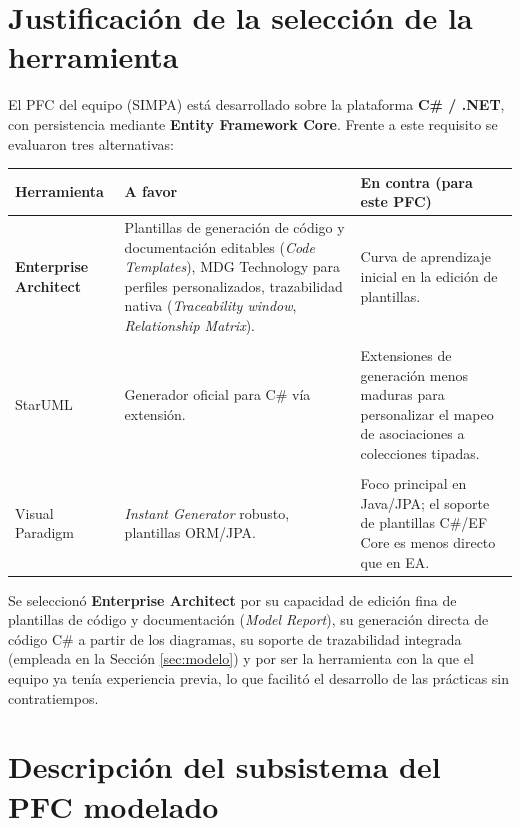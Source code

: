 \documentclass[11pt,a4paper]{article}
\begin{document}
	\section{Justificación de la selección de la herramienta}
	
	El PFC del equipo (SIMPA) está desarrollado sobre la plataforma \textbf{C\# / .NET}, con persistencia mediante \textbf{Entity Framework Core}. Frente a este requisito se evaluaron tres alternativas:
	
	\begin{center}
		\begin{tabularx}{\textwidth}{lXX}
			\toprule
			\textbf{Herramienta} & \textbf{A favor} & \textbf{En contra (para este PFC)} \\
			\midrule
			\textbf{Enterprise Architect} & Plantillas de generación de código y documentación editables (\textit{Code Templates}), MDG Technology para perfiles personalizados, trazabilidad nativa (\textit{Traceability window}, \textit{Relationship Matrix}). & Curva de aprendizaje inicial en la edición de plantillas. \\
			\\
			StarUML & Generador oficial para C\# vía extensión. & Extensiones de generación menos maduras para personalizar el mapeo de asociaciones a colecciones tipadas. \\
			\\
			Visual Paradigm & \textit{Instant Generator} robusto, plantillas ORM/JPA. & Foco principal en Java/JPA; el soporte de plantillas C\#/EF Core es menos directo que en EA. \\
			\bottomrule
		\end{tabularx}
	\end{center}
	
	Se seleccionó \textbf{Enterprise Architect} por su capacidad de edición fina de plantillas de código y documentación (\textit{Model Report}), su generación directa de código C\# a partir de los diagramas, su soporte de trazabilidad integrada (empleada en la Sección \ref{sec:modelo}) y por ser la herramienta con la que el equipo ya tenía experiencia previa, lo que facilitó el desarrollo de las prácticas sin contratiempos.
	
	\section{Descripción del subsistema del PFC modelado}
	
\end{document}
